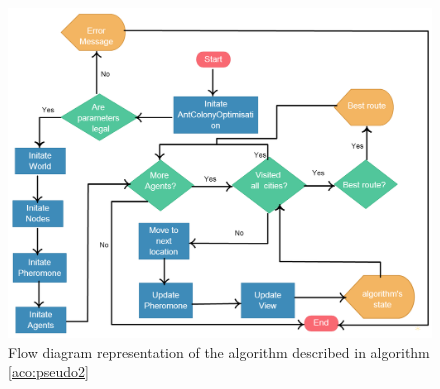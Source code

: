 \begin{figure}
\includegraphics[scale=0.45]{Images/chapter4/overallflow}
\caption{Flow diagram representation of the algorithm described in algorithm \ref{aco:pseudo2}}
\label{fig:overallFlow}
\end{figure}


